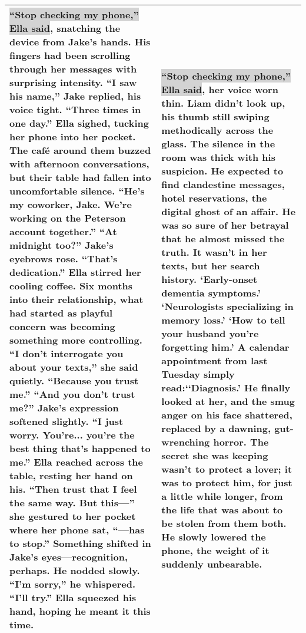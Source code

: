 \begin{table}[!htbp]
{\begin{tabular}{p{}  p{}}
    \midrule
     \colorbox{LightGray}{``Stop checking my phone,'' Ella said}, snatching the device from Jake's hands. His fingers had been scrolling through her messages with surprising intensity.
    ``I saw his name,'' Jake replied, his voice tight. ``Three times in one day.''
    Ella sighed, tucking her phone into her pocket. The café around them buzzed with afternoon conversations, but their table had fallen into uncomfortable silence.
    ``He's my coworker, Jake. We're working on the Peterson account together.''
    ``At midnight too?'' Jake's eyebrows rose. ``That's dedication.''
    Ella stirred her cooling coffee. Six months into their relationship, what had started as playful concern was becoming something more controlling.
    ``I don't interrogate you about your texts,'' she said quietly.
    ``Because you trust me.''
    ``And you don't trust me?''
    Jake's expression softened slightly. ``I just worry. You're... you're the best thing that's happened to me.''
    Ella reached across the table, resting her hand on his. ``Then trust that I feel the same way. But this—'' she gestured to her pocket where her phone sat, ``—has to stop.''
    Something shifted in Jake's eyes—recognition, perhaps. He nodded slowly.
    ``I'm sorry,'' he whispered. ``I'll try.''
    Ella squeezed his hand, hoping he meant it this time.
    & \colorbox{LightGray}{``Stop checking my phone,'' Ella said}, her voice worn thin. Liam didn't look up, his thumb still swiping methodically across the glass. The silence in the room was thick with his suspicion. He expected to find clandestine messages, hotel reservations, the digital ghost of an affair. He was so sure of her betrayal that he almost missed the truth. It wasn't in her texts, but her search history. `Early-onset dementia symptoms.' `Neurologists specializing in memory loss.' `How to tell your husband you're forgetting him.' A calendar appointment from last Tuesday simply read:`‘Diagnosis.' He finally looked at her, and the smug anger on his face shattered, replaced by a dawning, gut-wrenching horror. The secret she was keeping wasn't to protect a lover; it was to protect him, for just a little while longer, from the life that was about to be stolen from them both. He slowly lowered the phone, the weight of it suddenly unbearable. \\
    \bottomrule
    \end{tabular}
    }
\end{table}


